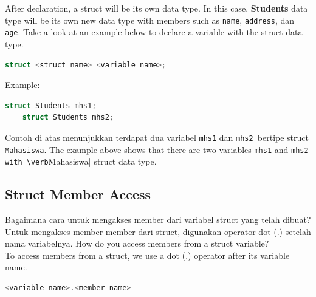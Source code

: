 After declaration, a struct will be its own data type. In this case, \textbf{Students} data type will be its own new data type
with members such as \verb|name|, \verb|address|, dan \verb|age|. Take a look at an example below to declare a variable
with the struct data type.

\begin{lstlisting}[language=c]
    struct <struct_name> <variable_name>;
\end{lstlisting}

Example:
\begin{lstlisting}[language=c]
    struct Students mhs1;
    struct Students mhs2;
\end{lstlisting}
Contoh di atas menunjukkan terdapat dua variabel \verb|mhs1| dan \verb|mhs2 |bertipe struct \verb|Mahasiswa|.
The example above shows that there are two variables \verb|mhs1| and \verb|mhs2 with \verb|Mahasiswa| struct data type.

\subsection{Struct Member Access}
Bagaimana cara untuk mengakses member dari variabel struct yang telah dibuat? \\
Untuk mengakses member-member dari struct, digunakan operator dot (.) setelah nama variabelnya.
How do you access members from a struct variable? \\
To access members from a struct, we use a dot (.) operator after its variable name.

\begin{lstlisting}[language=c]
    <variable_name>.<member_name>
\end{lstlisting}

